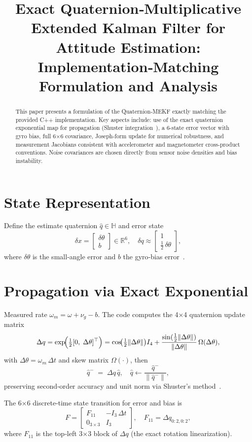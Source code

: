 \documentclass[12pt]{article}
\title{Exact Quaternion‐Multiplicative Extended Kalman Filter for Attitude Estimation:\\
Implementation‐Matching Formulation and Analysis}
\author{}
\date{}
\begin{document}
\maketitle

\begin{abstract}
This paper presents a formulation of the Quaternion‐MEKF exactly matching the provided C++ implementation.  Key aspects include: use of the exact quaternion exponential map for propagation (Shuster integration~\cite{Shuster1981}), a 6-state error vector with gyro bias, full 6×6 covariance, Joseph-form update for numerical robustness, and measurement Jacobians consistent with accelerometer and magnetometer cross-product conventions.  Noise covariances are chosen directly from sensor noise densities and bias instability.
\end{abstract}

\section{State Representation}
Define the estimate quaternion $\hat q\in\mathbb H$ and error state
\[
\delta x = \begin{bmatrix}\delta\theta\\ b\end{bmatrix}\in\mathbb R^6,
\quad \delta q \approx \begin{bmatrix}1\\ \tfrac12\,\delta\theta\end{bmatrix}, 
\]
where $\delta\theta$ is the small‐angle error and $b$ the gyro‐bias error~\cite{Lefferts1982,Markley2003}.

\section{Propagation via Exact Exponential}
Measured rate $\omega_m=\omega+\nu_g - b$.  The code computes the 4×4 quaternion update matrix
\[
\Delta q = \exp\!\Bigl(\tfrac12 [0,\;\Delta\theta]^\top\Bigr)
= \cos\!\bigl(\tfrac12\|\Delta\theta\|\bigr)I_4
+ \frac{\sin(\tfrac12\|\Delta\theta\|)}{\|\Delta\theta\|}\,\Omega(\Delta\theta),
\]
with $\Delta\theta=\omega_m\,\Delta t$ and skew matrix $\Omega(\cdot)$, then
\[
\hat q^-\;=\;\Delta q\,\hat q,
\quad
\hat q\leftarrow\frac{\hat q^-}{\|\hat q^-\|},
\]
preserving second‐order accuracy and unit norm via Shuster’s method~\cite{Shuster1981}.

The 6×6 discrete‐time state transition for error and bias is
\[
F = 
\begin{bmatrix}
F_{11} & -I_3\,\Delta t\\
0_{3\times3} & I_3
\end{bmatrix}, 
\quad
F_{11} = \Delta q_{0:2,0:2},
\]
where $F_{11}$ is the top‐left 3×3 block of $\Delta q$ (the exact rotation linearization).
\end{document}
